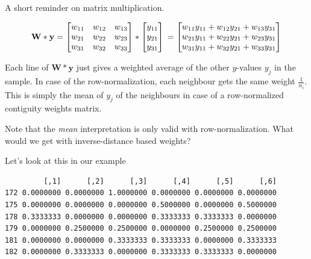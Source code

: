\documentclass[
  letterpaper,
  DIV=11,
  numbers=noendperiod]{scrreprt}
\newenvironment{Shaded}{\begin{snugshade}}{\end{snugshade}}
\newcommand{\NormalTok}[1]{\textcolor[rgb]{0.00,0.23,0.31}{#1}}
\newcommand{\OtherTok}[1]{\textcolor[rgb]{0.00,0.23,0.31}{#1}}
\newcommand{\SpecialCharTok}[1]{\textcolor[rgb]{0.37,0.37,0.37}{#1}}
\begin{document}
A short reminder on matrix multiplication.

\[
\boldsymbol{\mathbf{W}} * \boldsymbol{\mathbf{y}} =
\begin{bmatrix}
w_{11} & w_{12} & w_{13}\\
w_{21} & w_{22} & w_{23}\\
w_{31} & w_{32} & w_{33} 
\end{bmatrix} *
\begin{bmatrix}
y_{11} \\
y_{21} \\
y_{31}  
\end{bmatrix}\\
= \begin{bmatrix}
w_{11}y_{11} + w_{12}y_{21} + w_{13}y_{31}\\
w_{21}y_{11} + w_{22}y_{21} + w_{23}y_{31}\\
w_{31}y_{11} + w_{32}y_{21} + w_{33}y_{31}  
\end{bmatrix}
\]

Each line of \(\boldsymbol{\mathbf{W}} * \boldsymbol{\mathbf{y}}\) just
gives a weighted average of the other \(y\)-values \(y_j\) in the
sample. In case of the row-normalization, each neighbour gets the same
weight \(\frac{1}{n_i}\). This is simply the mean of \(y_j\) of the
neighbours in case of a row-normalized contiguity weights matrix.

Note that the \emph{mean} interpretation is only valid with
row-normalization. What would we get with inverse-distance based
weights?

Let's look at this in our example

\begin{Shaded}
\end{Shaded}

\begin{verbatim}
         [,1]      [,2]      [,3]      [,4]      [,5]      [,6]
172 0.0000000 0.0000000 1.0000000 0.0000000 0.0000000 0.0000000
175 0.0000000 0.0000000 0.0000000 0.5000000 0.0000000 0.5000000
178 0.3333333 0.0000000 0.0000000 0.3333333 0.3333333 0.0000000
179 0.0000000 0.2500000 0.2500000 0.0000000 0.2500000 0.2500000
181 0.0000000 0.0000000 0.3333333 0.3333333 0.0000000 0.3333333
182 0.0000000 0.3333333 0.0000000 0.3333333 0.3333333 0.0000000
\end{verbatim}
\end{document}
